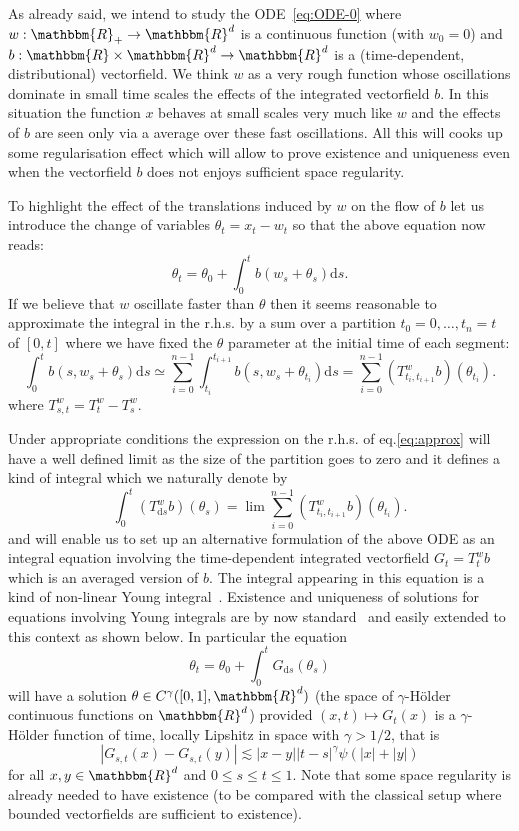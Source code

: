 \documentclass[a4paper,11pt]{article}
\newcommand{\mathd}{\mathrm{d}}
\begin{document}
As already said, we intend to study the ODE~{\eqref{eq:ODE-0}} where
$w:\mathbbm{R}_{+} \to \mathbbm{R}^{d}$ is a continuous function (with $w_{0}
=0$) and $b:\mathbbm{R} \times \mathbbm{R}^{d} \to \mathbbm{R}^{d}$ is a
(time-dependent, distributional) vectorfield. We think $w$ as a very rough
function whose oscillations dominate in small time scales the effects of the
integrated vectorfield $b$. In this situation the function $x$ behaves at
small scales very much like $w$ and the effects of $b$ are seen only via a
average over these fast oscillations. All this will cooks up some
regularisation effect which will allow to prove existence and uniqueness even
when the vectorfield $b$ does not enjoys sufficient space regularity.

To highlight the effect of the translations induced by $w$ on the flow of $b$
let us introduce the change of variables $\theta_{t} =x_{t} -w_{t}$ so that
the above equation now reads:
\[ \theta_{t} = \theta_{0} + \int_{0}^{t} b (w_{s} + \theta_{s} ) \mathd s. \]
If we believe that $w$ oscillate faster than $\theta$ then it seems reasonable
to approximate the integral in the r.h.s. by a sum over a partition $t_{0} =0,
\ldots ,t_{n} =t$ of $[0,t]$ where we have fixed the $\theta$ parameter at the
initial time of each segment:
\begin{equation}
  \label{eq:approx} \int_{0}^{t} b (s,w_{s} + \theta_{s} ) \mathd s \simeq
  \sum_{i=0}^{n-1} \int_{t_{i}}^{t_{i+1}} b (s,w_{s} + \theta_{t_{i}} ) \mathd
  s= \sum_{i=0}^{n-1} (T^{w}_{t_{i} ,t_{i+1}} b) ( \theta_{t_{i}} ) .
\end{equation}
where $T^{w}_{s,t} =T^{w}_{t} -T^{w}_{s}$.



Under appropriate conditions the expression on the r.h.s. of
eq.{\eqref{eq:approx}} will have a well defined limit as the size of the
partition goes to zero and it defines a kind of integral which we naturally
denote by
\[ \int_{0}^{t} (T^{w}_{\mathd s} b) ( \theta_{s} ) = \lim   \sum_{i=0}^{n-1}
   (T^{w}_{t_{i} ,t_{i+1}} b) ( \theta_{t_{i}} ) . \]
and will enable us to set up an alternative formulation of the above ODE as an
integral equation involving the time-dependent integrated vectorfield $G_{t}
=T^{w}_{t} b$ which is an averaged version of $b$. The integral appearing in
this equation is a kind of non-linear Young integral~{\cite{Young}}. Existence
and uniqueness of solutions for equations involving Young integrals are by now
standard~{\cite{Lyons,controlling,FV}} and easily extended to this context as
shown below. In particular the equation
\[ \theta_{t} = \theta_{0} + \int_{0}^{t} G_{\mathd s} ( \theta_{s} ) \]
will have a solution $\theta \in C^{\gamma} ([0,1],\mathbbm{R}^{d} )$ (the
space of $\gamma$-H\"older continuous functions on $\mathbbm{R}^{d}$) provided
$(x,t) \mapsto G_{t} (x)$ is a $\gamma$-H\"older function of time, locally
Lipshitz in space with $\gamma >1/2$, that is
\[ |G_{s,t} (x)-G_{s,t} (y)| \lesssim |x-y|  |t-s|^{\gamma} \psi ( | x | + | y
   | ) \]
for all $x,y \in \mathbbm{R}^{d}$ and $0 \leqslant s \leqslant t \leqslant 1$.
Note that some space regularity is already needed to have existence (to be
compared with the classical setup where bounded vectorfields are sufficient to
existence).
\end{document}
